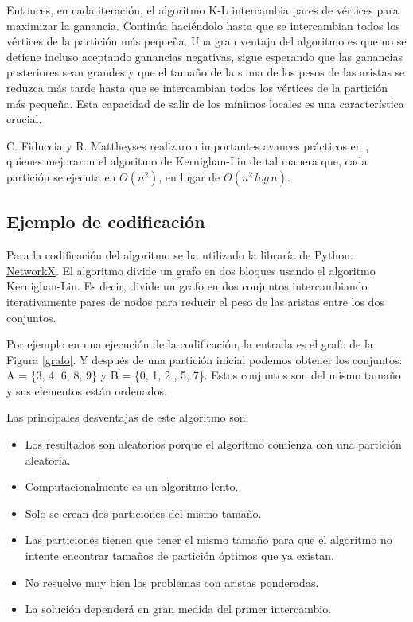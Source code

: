 Entonces, en cada iteración, el algoritmo K-L intercambia pares de vértices para maximizar la ganancia. Continúa haciéndolo hasta que se intercambian todos los vértices de la partición más pequeña. Una gran ventaja del algoritmo es que no se detiene incluso aceptando ganancias negativas, sigue esperando que las ganancias posteriores sean grandes y que el tamaño de la suma de los pesos de las aristas se reduzca más tarde hasta que se intercambian todos los vértices de la partición más pequeña. Esta capacidad de salir de los mínimos locales es una característica crucial.

C. Fiduccia y R. Mattheyses realizaron importantes avances prácticos en \cite{FiducciaMattheyses}, quienes mejoraron el algoritmo de  Kernighan-Lin\cite{KernighanLin} de tal manera que, cada partición se ejecuta en $O({n}^2)$, en lugar de $O({n}^2 \, log \, n)$.

\subsection{Ejemplo de codificación}

Para la codificación del algoritmo se ha utilizado la libraría de Python: \href{https://networkx.github.io/documentation/stable/reference/algorithms/generated/networkx.algorithms.community.kernighan_lin.kernighan_lin_bisection.html}{NetworkX}. El algoritmo divide un grafo en dos bloques usando el algoritmo Kernighan-Lin\cite{KernighanLin}. Es decir, divide un grafo en dos conjuntos intercambiando iterativamente pares de nodos para reducir el peso de las aristas entre los dos conjuntos.

Por ejemplo en una ejecución de la codificación, la entrada es el grafo de la Figura \ref{grafo}. Y después de una partición inicial podemos obtener los conjuntos: A = \{3, 4, 6, 8, 9\} y B = \{0, 1, 2 , 5, 7\}. Estos conjuntos son del mismo tamaño y sus elementos están ordenados.

Las principales desventajas de este algoritmo son:

\begin{itemize}
	\item Los resultados son aleatorios porque el algoritmo comienza con una partición aleatoria.
	\item Computacionalmente es un algoritmo lento.
	\item Solo se crean dos particiones del mismo tamaño.
	\item Las particiones tienen que tener el mismo tamaño para que el algoritmo no intente encontrar tamaños de partición óptimos que ya existan.
	\item No resuelve muy bien los problemas con aristas ponderadas.
	\item La solución dependerá en gran medida del primer intercambio.
\end{itemize}

